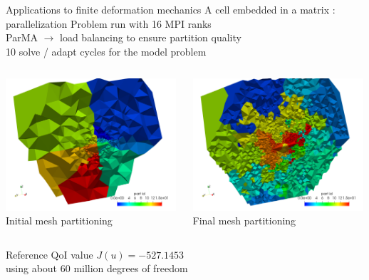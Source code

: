 \documentclass[fleqn]{beamer}
\begin{document}
\begin{frame}{Applications to finite deformation mechanics}
{A cell embedded in a matrix : parallelization}
Problem run with 16 MPI ranks \\
ParMA $\rightarrow$ load balancing to ensure partition quality \\
10 solve / adapt cycles for the model problem \\
\vspace{1em}
\begin{columns}
\begin{column}{0.5\textwidth}
\centering
\includegraphics[width=0.99\textwidth]{../img/aut_glial_initial_parts} \\
Initial mesh partitioning
\end{column}
\begin{column}{0.5\textwidth}%
\centering
\includegraphics[width=0.99\textwidth]{../img/aut_glial_final_parts} \\
Final mesh partitioning
\end{column}
\end{columns}
\vspace{1em}
Reference QoI value $J(u) = −527.1453$ \\
using about $60$ million degrees of freedom
\end{frame}
\end{document}
